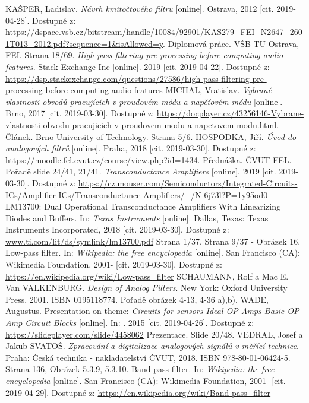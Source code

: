 \documentclass[twoside]{article}
\begin{document}
\begin{thebibliography}{999}
KAŠPER, Ladislav. \textit{Návrh kmitočtového filtru} [online]. Ostrava, 2012 [cit. 2019-04-28]. Dostupné z: \url{https://dspace.vsb.cz/bitstream/handle/10084/92901/KAS279_FEI_N2647_2601T013_2012.pdf?sequence=1&isAllowed=y}. Diplomová práce. VŠB-TU Ostrava, FEI. Strana 18/69.
\textit{High-pass filtering pre-processing before computing audio features}. Stack Exchange Inc [online]. 2019 [cit. 2019-04-22]. Dostupné z: \url{https://dsp.stackexchange.com/questions/27586/high-pass-filtering-pre-processing-before-computing-audio-features}
MICHAL, Vratislav. \textit{Vybrané vlastnosti obvodů pracujících v proudovém módu a napěťovém módu} [online]. Brno, 2017 [cit. 2019-03-30]. Dostupné z: \url{https://docplayer.cz/43256146-Vybrane-vlastnosti-obvodu-pracujicich-v-proudovem-modu-a-napetovem-modu.html}. Článek. Brno University of Technology. Strana 5/6.
HOSPODKA, Jiří. \textit{Úvod do analogových filtrů} [online]. Praha, 2018 [cit. 2019-03-30]. Dostupné z: \url{https://moodle.fel.cvut.cz/course/view.php?id=1434}. Přednáška. ČVUT FEL. Pořadě slide 24/41, 21/41.
\textit{Transconductance Amplifiers} [online]. 2019 [cit. 2019-03-30]. Dostupné z: \url{https://cz.mouser.com/Semiconductors/Integrated-Circuits-ICs/Amplifier-ICs/Transconductance-Amplifiers/_/N-6j73l?P=1y95od0}
LM13700: Dual Operational Transconductance Amplifiers With Linearizing Diodes and Buffers. In: \textit{Texas Instruments} [online]. Dallas, Texas: Texas Instruments Incorporated, 2018 [cit. 2019-03-30]. Dostupné z: \url{www.ti.com/lit/ds/symlink/lm13700.pdf} Strana 1/37. Strana 9/37 - Obrázek 16.
Low-pass filter. In: \textit{Wikipedia: the free encyclopedia} [online]. San Francisco (CA): Wikimedia Foundation, 2001- [cit. 2019-03-30]. Dostupné z: \url{https://en.wikipedia.org/wiki/Low-pass_filter}
SCHAUMANN, Rolf a Mac E. Van VALKENBURG. \textit{Design of Analog Filters}. New York: Oxford University Press, 2001. ISBN 0195118774. Pořadě obrázek 4-13, 4-36 a),b).
WADE, Augustus. Presentation on theme: \textit{Circuits for sensors Ideal OP Amps Basic OP Amp Circuit Blocks} [online]. In: . 2015 [cit. 2019-04-26]. Dostupné z: \url{https://slideplayer.com/slide/4458062} Prezentace. Slide 20/48.
VEDRAL, Josef a Jakub SVATOŠ. \textit{Zpracování a digitalizace analogových signálů v měřící technice}. Praha: Česká technika - nakladatelství ČVUT, 2018. ISBN 978-80-01-06424-5. Strana 136, Obrázek 5.3.9, 5.3.10.
Band-pass filter. In: \textit{Wikipedia: the free encyclopedia} [online]. San Francisco (CA): Wikimedia Foundation, 2001- [cit. 2019-04-29]. Dostupné z: \url{https://en.wikipedia.org/wiki/Band-pass_filter}
\end{thebibliography}
\end{document}
